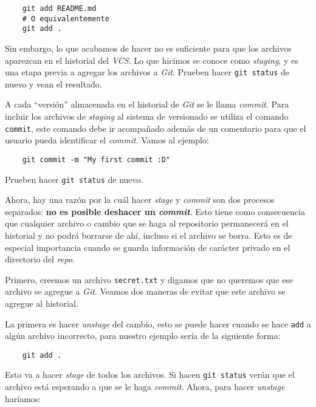   \begin{verbatim}
    git add README.md 
    # O equivalentemente 
    git add .
  \end{verbatim}

  Sin embargo, lo que acabamos de hacer no es suficiente para que los archivos aparezcan en el 
  historial del \textit{VCS}. Lo que hicimos se conoce como \textit{staging}, y es una etapa previa
  a agregar los archivos a \textit{Git}.
  Prueben hacer \texttt{git status} de nuevo y vean el resultado.

  A cada \enquote{versión} almacenada en el historial de \textit{Git} se le llama \textit{commit}.
  Para incluir los archivos de \textit{staging} al sistema de versionado se utiliza el comando 
  \texttt{commit}, este comando debe ir acompañado además de un comentario para que el usuario pueda
  identificar el \textit{commit}.
  Vamos al ejemplo:

  \begin{verbatim}
    git commit -m "My first commit :D"
  \end{verbatim}

  Prueben hacer \texttt{git status} de nuevo.

  Ahora, hay una razón por la cuál hacer \textit{stage} y \textit{commit} son dos procesos 
  separados: \textbf{no es posible deshacer un \textit{commit}}.
  Esto tiene como consecuencia que cualquier archivo o cambio que se haga al repositorio permanecerá
  en el historial y no podrá borrarse de ahí, incluso si el archivo se borra.
  Esto es de especial importancia cuando se guarda información de carácter privado en el directorio
  del \textit{repo}.

  Primero, creemos un archivo \texttt{secret.txt} y digamos que no queremos que ese archivo se 
  agregue a \textit{Git}.
  Veamos dos maneras de evitar que este archivo se agregue al historial.

  La primera es hacer \textit{unstage} del cambio, esto se puede hacer cuando se hace \texttt{add} a
  algún archivo incorrecto, para nuestro ejemplo sería de la siguiente forma:

  \begin{verbatim}
    git add .
  \end{verbatim}

  Esto va a hacer \textit{stage} de todos los archivos.
  Si hacen \texttt{git status} verán que el archivo está esperando a que se le haga \textit{commit}.
  Ahora, para hacer \textit{unstage} haríamos:

